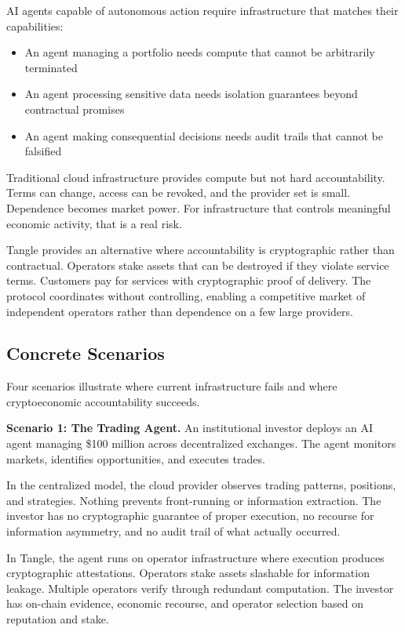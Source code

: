 \documentclass[11pt,a4paper]{article}
\begin{document}
AI agents capable of autonomous action require infrastructure that matches their capabilities:

\begin{itemize}
    \item An agent managing a portfolio needs compute that cannot be arbitrarily terminated
    \item An agent processing sensitive data needs isolation guarantees beyond contractual promises
    \item An agent making consequential decisions needs audit trails that cannot be falsified
\end{itemize}

Traditional cloud infrastructure provides compute but not hard accountability. Terms can change, access can be revoked, and the provider set is small. Dependence becomes market power. For infrastructure that controls meaningful economic activity, that is a real risk.

Tangle provides an alternative where accountability is cryptographic rather than contractual. Operators stake assets that can be destroyed if they violate service terms. Customers pay for services with cryptographic proof of delivery. The protocol coordinates without controlling, enabling a competitive market of independent operators rather than dependence on a few large providers.

\subsection{Concrete Scenarios}

Four scenarios illustrate where current infrastructure fails and where cryptoeconomic accountability succeeds.

\textbf{Scenario 1: The Trading Agent.} An institutional investor deploys an AI agent managing \$100 million across decentralized exchanges. The agent monitors markets, identifies opportunities, and executes trades.

In the centralized model, the cloud provider observes trading patterns, positions, and strategies. Nothing prevents front-running or information extraction. The investor has no cryptographic guarantee of proper execution, no recourse for information asymmetry, and no audit trail of what actually occurred.

In Tangle, the agent runs on operator infrastructure where execution produces cryptographic attestations. Operators stake assets slashable for information leakage. Multiple operators verify through redundant computation. The investor has on-chain evidence, economic recourse, and operator selection based on reputation and stake.
\end{document}

